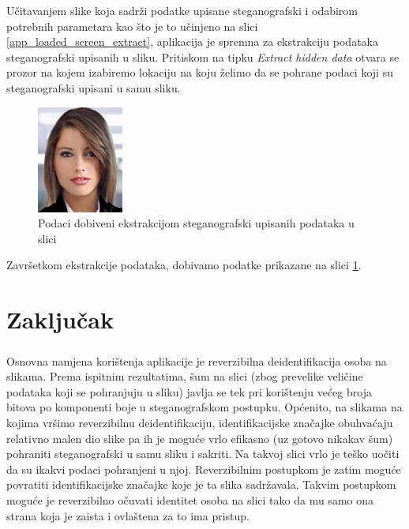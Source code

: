 \documentclass[times, utf8, seminar, numeric]{fer}
\begin{document}
Učitavanjem slike koja sadrži podatke upisane steganografski i odabirom potrebnih parametara kao što je to učinjeno na slici \ref{app_loaded_screen_extract}, aplikacija je spremna za ekstrakciju podataka steganografski upisanih u sliku. Pritiskom na tipku \textit{Extract hidden data} otvara se prozor na kojem izabiremo lokaciju na koju želimo da se pohrane podaci koji su steganografski upisani u samu sliku.

\begin{figure}[H]
\caption{Podaci dobiveni ekstrakcijom steganografski upisanih podataka u slici}
\label{extracted_stego_data}
\centerline{\includegraphics[scale=0.6]{images/extracted_stego_data.png}}
\end{figure}

Završetkom ekstrakcije podataka, dobivamo podatke prikazane na slici \ref{extracted_stego_data}. 

\chapter{Zaključak}

\paragraph{}
Osnovna namjena korištenja aplikacije je reverzibilna deidentifikacija osoba na slikama. Prema ispitnim rezultatima, šum na slici (zbog prevelike veličine podataka koji se pohranjuju u sliku) javlja se tek pri korištenju većeg broja bitova po komponenti boje u steganografskom postupku. Općenito, na slikama na kojima vršimo reverzibilnu deidentifikaciju, identifikacijske značajke obuhvaćaju relativno malen dio slike pa ih je moguće vrlo efikasno (uz gotovo nikakav šum) pohraniti steganografski u samu sliku i sakriti. Na takvoj slici vrlo je teško uočiti da su ikakvi podaci pohranjeni u njoj. Reverzibilnim postupkom je zatim moguće povratiti identifikacijske značajke koje je ta slika sadržavala. Takvim postupkom moguće je reverzibilno očuvati identitet osoba na slici tako da mu samo ona strana koja je zaista i ovlaštena za to ima pristup. 
\end{document}
